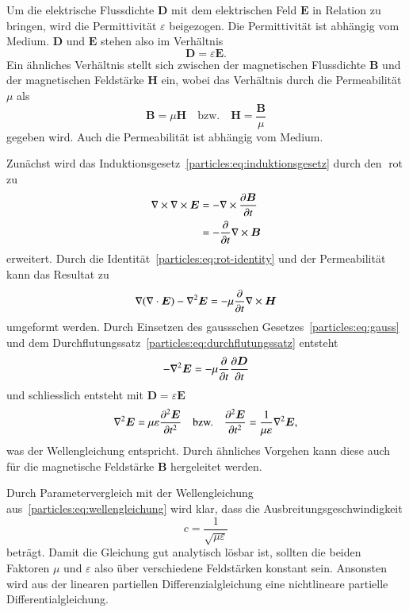 Um die elektrische Flussdichte $\boldsymbol{D}$ mit dem elektrischen Feld $\boldsymbol{E}$ in Relation zu bringen, 
wird die Permittivität $\varepsilon$ beigezogen.
Die Permittivität ist abhängig vom Medium. 
$\boldsymbol{D}$ und $\boldsymbol{E}$ stehen also im Verhältnis
\[
    \boldsymbol{D} = \varepsilon \boldsymbol{E}.
    \label{particles:eq:de}
\]
Ein ähnliches Verhältnis stellt sich zwischen der magnetischen Flussdichte $\boldsymbol{B}$ und der magnetischen Feldstärke $\boldsymbol{H}$ ein, wobei das Verhältnis durch die Permeabilität $\mu$ als
\[
    \boldsymbol{B} = \mu \boldsymbol{H} \quad \text{bzw.} \quad \boldsymbol{H} = \frac{\boldsymbol{B}}{\mu}
    \label{particles:eq:bh}
\]
gegeben wird.
Auch die Permeabilität ist abhängig vom Medium.

Zunächst wird das Induktionsgesetz~\eqref{particles:eq:induktionsgesetz} durch den $\operatorname{rot}$ zu
\begin{align}
    \nabla \times \nabla \times \boldsymbol{E} 
        &= - \nabla \times \frac{\d\boldsymbol{B}}{\d t} \\
        &= - \frac{\d}{\d t} \nabla \times \boldsymbol{B}
\end{align}
erweitert.
Durch die Identität~\eqref{particles:eq:rot-identity} und der Permeabilität kann das Resultat zu
\[
    \nabla(\nabla \cdot \boldsymbol{E}) - \nabla^2 \boldsymbol{E} = -\mu \frac{\d}{\d t} \nabla \times \boldsymbol{H}
\]
umgeformt werden.
Durch Einsetzen des gaussschen Gesetzes~\eqref{particles:eq:gauss} und dem Durchflutungssatz~\eqref{particles:eq:durchflutungssatz} entsteht
\[
    - \nabla^2 \boldsymbol{E} = -\mu \frac{\d}{\d t} \frac{\d \boldsymbol{D}}{\d t}
\]
und schliesslich entsteht mit $\boldsymbol{D} = \varepsilon \boldsymbol{E}$
\[
    \nabla^2 \boldsymbol{E} = \mu\varepsilon \frac{\d^2 \boldsymbol{E}}{\d t^2} 
    \quad \text{bzw.} \quad
    \frac{\d^2 \boldsymbol{E}}{\d t^2} = \frac{1}{\mu \varepsilon} \nabla^2 \boldsymbol{E},
\]
was der Wellengleichung entspricht.
Durch ähnliches Vorgehen kann diese auch für die magnetische Feldstärke $\boldsymbol{B}$ hergeleitet werden.

Durch Parametervergleich mit der Wellengleichung aus~\eqref{particles:eq:wellengleichung} wird klar, dass die Ausbreitungsgeschwindigkeit
\[
    c = \frac{1}{\sqrt{\mu\varepsilon}}\label{particles:eq:lichtgeschwindigkeit}
\]
beträgt.
Damit die Gleichung gut analytisch lösbar ist, sollten die beiden Faktoren $\mu$ und $\varepsilon$ also über verschiedene Feldstärken konstant sein.
Ansonsten wird aus der linearen partiellen Differenzialgleichung eine nichtlineare partielle Differentialgleichung.


